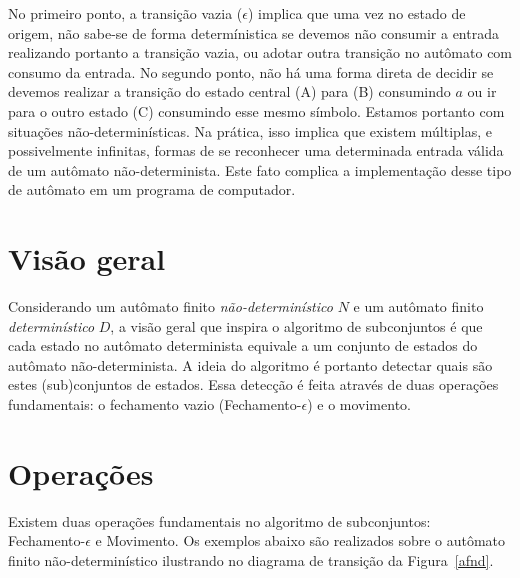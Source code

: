 \documentclass{compiladores}
\newcommand{\vazio}{{\LARGE$\epsilon$}\xspace}
\begin{document}
No primeiro ponto, a transição vazia (\vazio) implica que uma vez no
estado de origem, não sabe-se de forma determínistica se devemos não
consumir a entrada realizando portanto a transição vazia, ou adotar
outra transição no autômato com consumo da entrada. No segundo ponto,
não há uma forma direta de decidir se devemos realizar a transição do
estado central (A) para (B) consumindo $a$ ou ir para o outro estado
(C) consumindo esse mesmo símbolo. Estamos portanto com situações
não-determinísticas. Na prática, isso implica que existem múltiplas, e
possivelmente infinitas, formas de se reconhecer uma determinada
entrada válida de um autômato não-determinista. Este fato complica a
implementação desse tipo de autômato em um programa de computador.

\section{Visão geral}

Considerando um autômato finito \emph{não-determinístico} $N$ e um
autômato finito \emph{determinístico} $D$, a visão geral que inspira o
algoritmo de subconjuntos é que cada estado no autômato determinista
equivale a um conjunto de estados do autômato não-determinista. A
ideia do algoritmo é portanto detectar quais são estes (sub)conjuntos de
estados. Essa detecção é feita através de duas operações fundamentais:
o fechamento vazio (Fechamento-\vazio) e o movimento.

\section{Operações}

Existem duas operações fundamentais no algoritmo de subconjuntos:
Fechamento-\vazio e Movimento. Os exemplos abaixo são realizados sobre
o autômato finito não-determinístico ilustrando no diagrama de
transição da Figura~\ref{afnd}.
\end{document}
